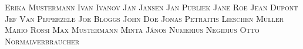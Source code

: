 \documentclass[12pt,a4paper]{article}
\newcommand{\cover}[1]{\mbox{}\newpage\mbox{}\vfill \textsc{#1}
\vfill\vfill\newpage}
\begin{document}
\centering\huge
\cover{Erika Mustermann}%
\cover{Ivan Ivanov}%
\cover{Jan Jansen}%
\cover{Jan Publiek}%
\cover{Jane Roe}%
\cover{Jean Dupont}%
\cover{Jef Van Pijperzele}%
\cover{Joe Bloggs}%
\cover{John Doe}%
\cover{Jonas Petraitis}%
\cover{Lieschen Müller}%
\cover{Mario Rossi}%
\cover{Max Mustermann}%
\cover{Minta János}%
\cover{Numerius Negidius}%
\cover{Otto Normalverbraucher}%
\end{document}
